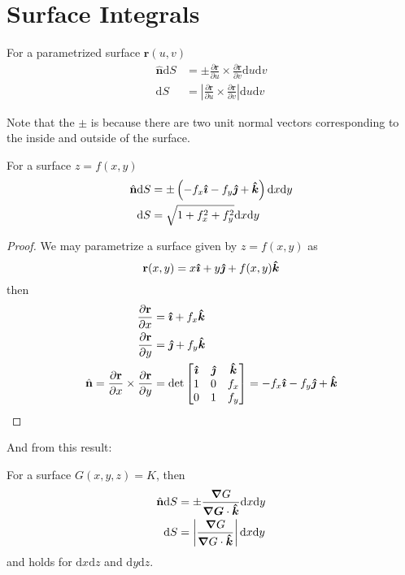 \section{Surface Integrals}
\begin{theorem}
	For a parametrized surface $\mathbf{r}(u,v)$ 
	\begin{align*}
		\hat{\mathbf{n}}\mathrm{d}S &= \pm \frac{\partial \mathbf{r}}{\partial u} \times \frac{\partial \mathbf{r}}{\partial v} \mathrm{d}u\mathrm{d}v\\
		\mathrm{d}S &= \left| \frac{\partial \mathbf{r}}{\partial u} \times \frac{\partial \mathbf{r}}{\partial v} \right| \mathrm{d}u\mathrm{d}v 
	\end{align*}	
\end{theorem}
\begin{remark}
	Note that the $\pm$ is because there are two unit normal vectors corresponding to the inside and outside of the surface.
\end{remark}
\begin{corollary}
	For a surface $z = f(x,y)$ 
	\begin{align*}
		\hat{\mathbf{n}}\mathrm{d}S &= \pm \left( -f_x\bm {\hat \imath} - f_y\bm {\hat \jmath} + \bm {\hat k} \right) \mathrm{d}x\mathrm{d}y\\
		\mathrm{d}S &= \sqrt{1 + f_x^{2} + f_y^{2}}\mathrm{d}x\mathrm{d}y
	\end{align*}
\end{corollary}
\begin{proof}
	We may parametrize a surface given by $z = f(x,y)$ as
	\[
		\mathbf{r}(x,y) = x\bm {\hat \imath} + y\bm {\hat \jmath} + f(x,y)\bm {\hat k}
	\] 
	then 
	\begin{align*}
		\frac{\partial \mathbf{r}}{\partial x} &= \bm {\hat \imath} + f_x\bm {\hat k}\\
		\frac{\partial \mathbf{r}}{\partial y} &= \bm {\hat \jmath} + f_y \bm {\hat k}\\
		\hat{\mathbf{n}} = \frac{\partial \mathbf{r}}{\partial x} \times \frac{\partial \mathbf{r}}{\partial y} &= \det 
		\begin{bmatrix}
			\bm {\hat \imath} & \bm {\hat \jmath} & \bm {\hat k} \\
			1 & 0 & f_x \\
			0 & 1 & f_y
		\end{bmatrix}
											   = -f_x \bm {\hat \imath} - f_y \bm {\hat \jmath} + \bm {\hat k}
	\end{align*}
	
\end{proof}
And from this result:
\begin{corollary}
	For a surface $G(x,y,z) = K$, then 
	\begin{align*}
		\hat{\mathbf{n}}\mathrm{d}S &= \pm \frac{\bm{\nabla}G}{\bm{\nabla{G}}\cdot \bm {\hat k}} \mathrm{d}x\mathrm{d}y\\
		\mathrm{d}S &= \left| \frac{\bm\nabla G}{\bm\nabla G \cdot \bm {\hat k}} \right| \mathrm{d}x\mathrm{d}y
	\end{align*}
	and holds for $\mathrm{d}x\mathrm{d}z$ and $\mathrm{d}y\mathrm{d}z$.
\end{corollary}
